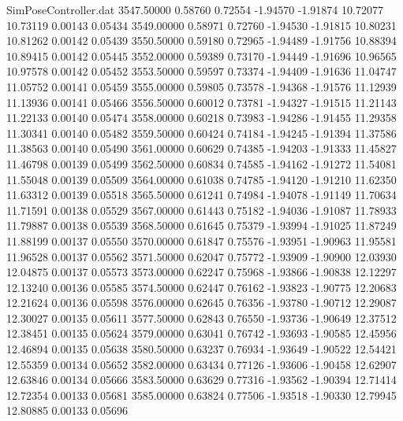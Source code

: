\begin{filecontents}{SimPoseController.dat}
3547.50000    0.58760    0.72554    -1.94570   -1.91874   10.72077   10.73119    0.00143    0.05434
3549.00000    0.58971    0.72760    -1.94530   -1.91815   10.80231   10.81262    0.00142    0.05439
3550.50000    0.59180    0.72965    -1.94489   -1.91756   10.88394   10.89415    0.00142    0.05445
3552.00000    0.59389    0.73170    -1.94449   -1.91696   10.96565   10.97578    0.00142    0.05452
3553.50000    0.59597    0.73374    -1.94409   -1.91636   11.04747   11.05752    0.00141    0.05459
3555.00000    0.59805    0.73578    -1.94368   -1.91576   11.12939   11.13936    0.00141    0.05466
3556.50000    0.60012    0.73781    -1.94327   -1.91515   11.21143   11.22133    0.00140    0.05474
3558.00000    0.60218    0.73983    -1.94286   -1.91455   11.29358   11.30341    0.00140    0.05482
3559.50000    0.60424    0.74184    -1.94245   -1.91394   11.37586   11.38563    0.00140    0.05490
3561.00000    0.60629    0.74385    -1.94203   -1.91333   11.45827   11.46798    0.00139    0.05499
3562.50000    0.60834    0.74585    -1.94162   -1.91272   11.54081   11.55048    0.00139    0.05509
3564.00000    0.61038    0.74785    -1.94120   -1.91210   11.62350   11.63312    0.00139    0.05518
3565.50000    0.61241    0.74984    -1.94078   -1.91149   11.70634   11.71591    0.00138    0.05529
3567.00000    0.61443    0.75182    -1.94036   -1.91087   11.78933   11.79887    0.00138    0.05539
3568.50000    0.61645    0.75379    -1.93994   -1.91025   11.87249   11.88199    0.00137    0.05550
3570.00000    0.61847    0.75576    -1.93951   -1.90963   11.95581   11.96528    0.00137    0.05562
3571.50000    0.62047    0.75772    -1.93909   -1.90900   12.03930   12.04875    0.00137    0.05573
3573.00000    0.62247    0.75968    -1.93866   -1.90838   12.12297   12.13240    0.00136    0.05585
3574.50000    0.62447    0.76162    -1.93823   -1.90775   12.20683   12.21624    0.00136    0.05598
3576.00000    0.62645    0.76356    -1.93780   -1.90712   12.29087   12.30027    0.00135    0.05611
3577.50000    0.62843    0.76550    -1.93736   -1.90649   12.37512   12.38451    0.00135    0.05624
3579.00000    0.63041    0.76742    -1.93693   -1.90585   12.45956   12.46894    0.00135    0.05638
3580.50000    0.63237    0.76934    -1.93649   -1.90522   12.54421   12.55359    0.00134    0.05652
3582.00000    0.63434    0.77126    -1.93606   -1.90458   12.62907   12.63846    0.00134    0.05666
3583.50000    0.63629    0.77316    -1.93562   -1.90394   12.71414   12.72354    0.00133    0.05681
3585.00000    0.63824    0.77506    -1.93518   -1.90330   12.79945   12.80885    0.00133    0.05696

\end{filecontents}
